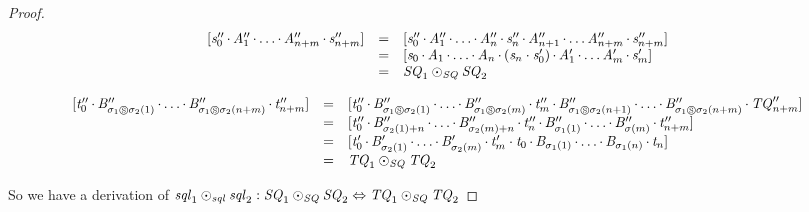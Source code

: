 \documentclass[acmsmall]{acmart}
\begin{document}
\begin{proof}
  \[
    \begin{array}{rcl}
      \SequenceOf{\String_0'' \SeqSep \Atom_1'' \SeqSep \ldots \SeqSep \Atom_{n+m}'' \SeqSep \String_{n+m}''}
      & = & \SequenceOf{\String_0'' \SeqSep \Atom_1'' \SeqSep \ldots \SeqSep \Atom_n'' \SeqSep \String_n'' \SeqSep \Atom_{n+1}'' \SeqSep 
            \ldots\Atom_{n+m}'' \SeqSep \String_{n+m}''}\\
      & = & \SequenceOf{\String_0 \SeqSep \Atom_1 \SeqSep \ldots \SeqSep \Atom_n \SeqSep (\String_n\Concat\String_0') \SeqSep \Atom_1' \SeqSep 
            \ldots\Atom_m' \SeqSep \String_m'}\\
      & = & \ConcatSequenceOf{\Sequence_1}{\Sequence_2}
    \end{array}
  \]


  \[
    \begin{array}{rcl}
      \SequenceOf{\StringAlt_0'' \SeqSep \AtomAlt_{\SwapPermutationOf{\sigma_1}{\sigma_2}(1)}'' \SeqSep \ldots \SeqSep 
      \AtomAlt_{\SwapPermutationOf{\sigma_1}{\sigma_2}(n+m)}'' \SeqSep \StringAlt_{n+m}''}
      & = &
            \SequenceOf{\StringAlt_0'' \SeqSep \AtomAlt_{\SwapPermutationOf{\sigma_1}{\sigma_2}(1)}'' \SeqSep 
            \ldots \SeqSep \AtomAlt_{\SwapPermutationOf{\sigma_1}{\sigma_2}(m)}'' \SeqSep 
            \StringAlt_m'' \SeqSep \AtomAlt_{\SwapPermutationOf{\sigma_1}{\sigma_2}(n+1)}'' \SeqSep 
            \ldots \SeqSep 
            \AtomAlt_{\SwapPermutationOf{\sigma_1}{\sigma_2}(n+m)}'' \SeqSep \SequenceAlt_{n+m}''}\\
      & = &
            \SequenceOf{\StringAlt_0'' \SeqSep \AtomAlt_{\sigma_2(1)+n}'' \SeqSep 
            \ldots \SeqSep \AtomAlt_{\sigma_2(m)+n}'' \SeqSep 
            \StringAlt_n'' \SeqSep \AtomAlt_{\sigma_1(1)}'' \SeqSep 
            \ldots \SeqSep 
            \AtomAlt_{\sigma(m)}'' \SeqSep \StringAlt_{n+m}''}\\
      & = &
            \SequenceOf{\StringAlt_0' \SeqSep \AtomAlt_{\sigma_2(1)}' \SeqSep 
            \ldots \SeqSep \AtomAlt_{\sigma_2(m)}' \SeqSep 
            \StringAlt_m'\Concat\StringAlt_0 \SeqSep \AtomAlt_{\sigma_1(1)} \SeqSep 
            \ldots \SeqSep 
            \AtomAlt_{\sigma_1(n)} \SeqSep \StringAlt_n}\\
      & = & \ConcatSequenceOf{\SequenceAlt_1}{\SequenceAlt_2}
    \end{array}
  \]

  So we have a derivation of $\mathit{sql}_1\odot_{\mathit{sql}}\mathit{sql}_2 :
  \mathit{SQ}_1\odot_{\mathit{SQ}}\mathit{SQ}_2 \Leftrightarrow
  \mathit{TQ}_1\odot_{\mathit{SQ}}\mathit{TQ}_2$


\end{proof}
\end{document}
